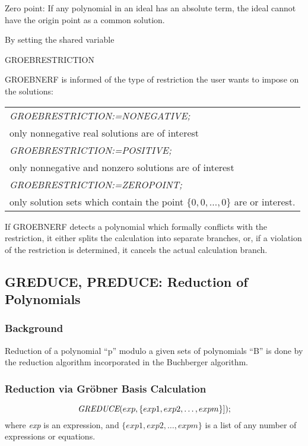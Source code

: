Zero point:  If any polynomial in an ideal has an absolute term, the ideal
cannot have the origin point as a common solution.

By setting the shared variable
\begin{center} GROEBRESTRICTION \end{center}
GROEBNERF is informed of the type of restriction the user wants to
impose on the solutions:
\begin{center}
\begin{tabular}{l}
{\it GROEBRESTRICTION:=NONEGATIVE;} \\
\hspace*{+.5cm} only nonnegative real solutions are of
interest\vspace*{4mm} \\
{\it GROEBRESTRICTION:=POSITIVE;} \\
\hspace*{+.5cm}only nonnegative and nonzero solutions are of
interest\vspace*{4mm} \\
{\it GROEBRESTRICTION:=ZEROPOINT;} \\
\hspace*{+.5cm}only solution sets which contain the point
$\{0,0,\ldots,0\}$ are or interest.
\end{tabular}
\end{center}

If GROEBNERF detects a polynomial which formally conflicts with the
restriction, it either splits the calculation into separate branches, or,
if a violation of the restriction is determined, it cancels the actual
calculation branch.


\subsection{GREDUCE, PREDUCE: Reduction of Polynomials}

\subsubsection{Background} \label{GROEBNER:background}
Reduction of a polynomial ``p'' modulo a given sets of polynomials
``B'' is done by the reduction algorithm incorporated in the
Buchberger algorithm.

\subsubsection{Reduction via Gr\"obner Basis Calculation}
\[
\mbox{\it  GREDUCE}(exp, \{exp1, exp2, \ldots , expm\}]);
\]
where {\it exp} is an expression, and $\{exp1, exp2,\ldots , expm\}$ is
a list of any number of expressions or equations.

